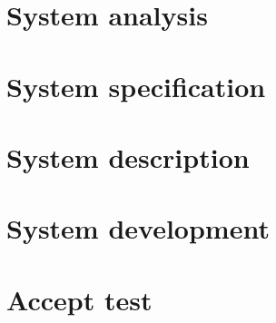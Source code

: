 



\frontmatter
% 
\cleardoublepage
%
%

\mainmatter
\cleardoublepage
\tableofcontents
\clearpage

%



\chapter{System analysis}

%
%
%


\chapter{System specification}


\chapter{System description}


\chapter{System development}






\chapter{Accept test}



\clearpage



\appendix
\appendixtocname
\addappheadtotoc


